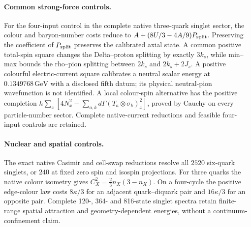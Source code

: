 \paragraph{Common strong-force controls.}
For the four-input control in the complete native three-quark singlet
sector, the colour and baryon-number costs reduce to $A+(8U/3-4A/9)P_{\rm split}$.
Preserving the coefficient of $P_{\rm split}$ preserves the calibrated
axial state. A common positive total-spin square changes the Delta--proton
splitting by exactly $3k_s$, while min--max bounds the rho--pion splitting
between $2k_s$ and $2k_s+2J_s$.
A positive colourful electric-current square calibrates a neutral
scalar energy at $0.1349768\,\mathrm{GeV}$ with a disclosed fifth datum;
its physical neutral-pion wavefunction is not identified.
A local colour-spin alternative has the positive completion
$h\sum_x[4N_x^2-\sum_{a,k}d\Gamma(T_a\otimes\sigma_k)_x^2]$,
proved by Cauchy on every particle-number sector. Complete native-current
reductions and feasible four-input controls are retained.


\paragraph{Nuclear and spatial controls.}
The exact native Casimir and cell-swap reductions resolve all $2520$
six-quark singlets, or $240$ at fixed zero spin and isospin projections.
For three quarks the native colour isometry gives
$C_X^2=\frac23 n_X(3-n_X)$. On a four-cycle the positive edge-colour
law costs $8\kappa/3$ for an adjacent quark--diquark pair and
$16\kappa/3$ for an opposite pair. Complete 120-, 364- and 816-state
singlet spectra retain finite-range spatial attraction and
geometry-dependent energies, without a continuum-confinement claim.


